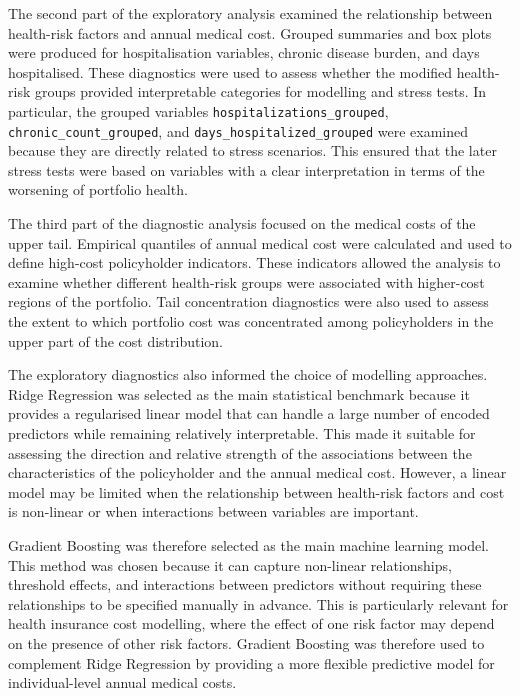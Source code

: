 	The second part of the exploratory analysis examined the relationship between health-risk factors and annual medical cost. Grouped summaries and box plots were produced for hospitalisation variables, chronic disease burden, and days hospitalised. These diagnostics were used to assess whether the modified health-risk groups provided interpretable categories for modelling and stress tests. In particular, the grouped variables \verb|hospitalizations_grouped|, \verb|chronic_count_grouped|, and \verb|days_hospitalized_grouped| were examined because they are directly related to stress scenarios. This ensured that the later stress tests were based on variables with a clear interpretation in terms of the worsening of portfolio health.
	
	The third part of the diagnostic analysis focused on the medical costs of the upper tail. Empirical quantiles of annual medical cost were calculated and used to define high-cost policyholder indicators. These indicators allowed the analysis to examine whether different health-risk groups were associated with higher-cost regions of the portfolio. Tail concentration diagnostics were also used to assess the extent to which portfolio cost was concentrated among policyholders in the upper part of the cost distribution.
	
	The exploratory diagnostics also informed the choice of modelling approaches. Ridge Regression was selected as the main statistical benchmark because it provides a regularised linear model that can handle a large number of encoded predictors while remaining relatively interpretable. This made it suitable for assessing the direction and relative strength of the associations between the characteristics of the policyholder and the annual medical cost. However, a linear model may be limited when the relationship between health-risk factors and cost is non-linear or when interactions between variables are important.
	
	Gradient Boosting was therefore selected as the main machine learning model. This method was chosen because it can capture non-linear relationships, threshold effects, and interactions between predictors without requiring these relationships to be specified manually in advance. This is particularly relevant for health insurance cost modelling, where the effect of one risk factor may depend on the presence of other risk factors. Gradient Boosting was therefore used to complement Ridge Regression by providing a more flexible predictive model for individual-level annual medical costs.
	
